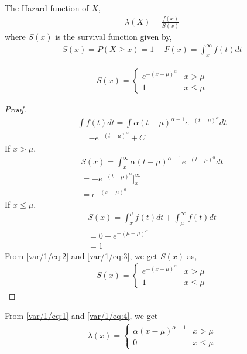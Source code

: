
The Hazard function of $X$,
\begin{align}
\lambda(X) = \frac{f(x)}{S(x)} \label{var/1/eq:1}
\end{align}
where $S(x)$ is the survival function given by,
\begin{align}
S(x) = P(X \geq x) = 1-F(x) = \int_{x}^{\infty}f(t)dt
\end{align}
\begin{lemma}
\begin{align}
S(x)=
\begin{cases}
e^{-(x-\mu)^\alpha} &x>\mu\\
1 &x\leq\mu
\end{cases}
\end{align}
\end{lemma}
\begin{proof}

\begin{align}
\int f(t)dt=\int \alpha(t-\mu)^{\alpha-1}e^{-(t-\mu)^\alpha}dt\\
=-e^{-(t-\mu)^\alpha} + C
\end{align}
If $x>\mu$, 
\begin{align}
S(x) = \int_{x}^{\infty} \alpha(t-\mu)^{\alpha-1}e^{-(t-\mu)^\alpha}dt\\
=-e^{-(t-\mu)^\alpha}]_{x}^{\infty}\\
=e^{-(x-\mu)^{\alpha}} \label{var/1/eq:2}
\end{align}
If $x\leq\mu$,
\begin{align}
S(x) = \int_{x}^{\mu}f(t)dt + \int_{\mu}^{\infty}f(t)dt\\
     = 0 + e^{-(\mu-\mu)^{\alpha}}\\
     =1 \label{var/1/eq:3}
\end{align}
From \eqref{var/1/eq:2} and \eqref{var/1/eq:3}, we get $S(x)$ as,
\begin{align}
S(x)=
\begin{cases}
e^{-(x-\mu)^\alpha} &x>\mu\\
1 &x\leq\mu \label{var/1/eq:4}
\end{cases}
\end{align}
\end{proof}
From \eqref{var/1/eq:1} and \eqref{var/1/eq:4}, we get
\begin{align}
\lambda(x) = 
\begin{cases}
\alpha(x-\mu)^{\alpha-1} &x>\mu\\
0 &x\leq\mu \label{var/1/eq:5}
\end{cases}
\end{align}
